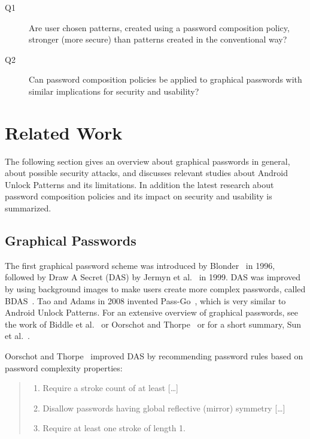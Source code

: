 \documentclass[twocolumn, a4paper, 10pt]{article}
\begin{document}
\begin{description}
	\item[Q1]  Are user chosen patterns, created using a password composition policy, stronger (more secure) than patterns created in the conventional way?
	\item[Q2] Can password composition policies be applied to graphical passwords with similar implications for security and usability?
\end{description}
  
  
\section{Related Work}
\label{sec:related}
The following section gives an overview about graphical passwords in general, about possible security attacks, and discusses relevant studies about Android Unlock Patterns and its limitations. In addition the latest research about password composition policies and its impact on security and usability is summarized.


\subsection{Graphical Passwords}
\label{sec:related:grafical}

The first graphical password scheme was introduced by Blonder~\cite{blonder1996graphical} in 1996, followed by Draw A Secret (DAS) by Jermyn et al.~\cite{Jermyn:1999:DAG:1251421.1251422} in 1999. DAS was improved by using background images to make users create more complex passwords, called BDAS~\cite{Dunphy:2010:CLR:1837110.1837114}. Tao and Adams in 2008 invented Pass-Go~\cite{tao2008pass}, which is very similar to Android Unlock Patterns. For an extensive overview of graphical passwords, see the work of Biddle et al.~\cite{Biddle:2012:GPL:2333112.2333114} or Oorschot and Thorpe~\cite{Oorschot:2008:PMU:1284680.1284685} or for a  short summary, Sun et al.~\cite{Sun2014308}.

Oorschot and Thorpe~\cite{Oorschot:2008:PMU:1284680.1284685} improved DAS by recommending password rules based on password complexity properties:

\begin{quote}
	\small
	\begin{enumerate}
		\setlength\itemsep{0em}
		\item Require a stroke count of at least [\dots]
		\item Disallow passwords having global reflective (mirror) symmetry [\dots]
		\item Require at least one stroke of length 1.
	\end{enumerate}
\end{quote}
\end{document}

